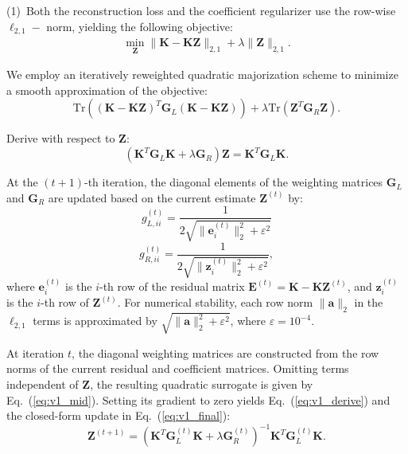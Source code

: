 \documentclass[ASNA,twocolumn]{USG} %
\begin{document}
(1)~Both the reconstruction loss and the coefficient regularizer use the row-wise $\ell_{2,1}-$ norm, yielding the following objective:
\begin{eqnarray}\label{Case1}
	\min_{\boldsymbol{Z}}\|\boldsymbol{K}-\boldsymbol{K} \boldsymbol{Z}\|_{2,1}+\lambda\|\boldsymbol{Z}\|_{2,1}.
\end{eqnarray}

We employ an iteratively reweighted quadratic majorization scheme to minimize a smooth approximation of the objective: 
\begin{equation}\label{eq:v1_mid}
    \text{Tr}((\boldsymbol{K}-\boldsymbol{K}\boldsymbol{Z})^T\boldsymbol{G}_L(\boldsymbol{K}-\boldsymbol{K}\boldsymbol{Z})) + \lambda\text{Tr}(\boldsymbol{Z}^T\boldsymbol{G}_R\boldsymbol{Z}).
\end{equation}

Derive with respect to $\boldsymbol{Z}$:
\begin{equation}\label{eq:v1_derive}
    \left(\boldsymbol{K}^T \boldsymbol{G}_L \boldsymbol{K}+\lambda \boldsymbol{G}_R\right) \boldsymbol{Z}=\boldsymbol{K}^T \boldsymbol{G}_L \boldsymbol{K}.
\end{equation}

At the $(t+1)$-th iteration, the diagonal elements of the weighting matrices $\boldsymbol{G}_L$ and $\boldsymbol{G}_R$ are updated based on the current estimate $\boldsymbol{Z}^{(t)}$ by:
\begin{equation}
g_{L,ii}^{(t)} = \frac{1}{2\sqrt{\|\boldsymbol e_i^{(t)}\|_2^2+\varepsilon^2}}
\end{equation}
\begin{equation}
g_{R,ii}^{(t)} = \frac{1}{2\sqrt{\|\boldsymbol{z}_{i}^{(t)}\|_2^2+\varepsilon^2}},
\end{equation}
where $\boldsymbol{e}_i^{(t)}$ is the $i$-th row of the residual matrix $\boldsymbol{E}^{(t)} = \boldsymbol{K} - \boldsymbol{K} \boldsymbol{Z}^{(t)}$, and $\boldsymbol{z}_i^{(t)}$ is the $i$-th row of $\boldsymbol{Z}^{(t)}$. For numerical stability, each row norm $\|\boldsymbol{a}\|_2$ in the $\ell_{2,1}$ terms is approximated by $\sqrt{\|\boldsymbol{a}\|_2^2+\varepsilon^2}$, where $\varepsilon=10^{-4}$.

At iteration $t$, the diagonal weighting matrices are constructed from the row norms of the current residual and coefficient matrices. Omitting terms independent of $\boldsymbol{Z}$, the resulting quadratic surrogate is given by Eq.~(\ref{eq:v1_mid}). Setting its gradient to zero yields Eq.~(\ref{eq:v1_derive}) and the closed-form update in Eq.~(\ref{eq:v1_final}):
\begin{equation}\label{eq:v1_final}
    \boldsymbol{Z}^{(t+1)}=\left(\boldsymbol{K}^T \boldsymbol{G}_L^{(t)} \boldsymbol{K}+\lambda \boldsymbol{G}_R^{(t)}\right)^{-1} \boldsymbol{K}^T \boldsymbol{G}_L^{(t)} \boldsymbol{K}.
\end{equation}
\end{document}
